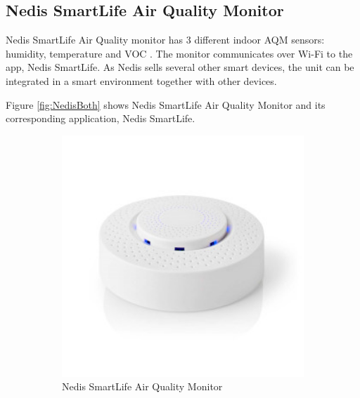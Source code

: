 \subsection{Nedis SmartLife Air Quality Monitor}
Nedis SmartLife Air Quality monitor has 3 different indoor \gls{AQM} sensors: humidity, temperature and VOC \cite{NedisDevice}. The monitor communicates over \gls{Wi-Fi} to the app, Nedis SmartLife. As Nedis sells several other smart devices, the unit can be integrated in a smart environment together with other devices. 

Figure \ref{fig:NedisBoth} shows Nedis SmartLife Air Quality Monitor and its corresponding application, Nedis SmartLife. 
\begin{figure} [H]
    \centering
    \begin{subfigure}{0.35\textwidth}
         \centering
         \includegraphics[width=1.2\textwidth]{figures/NedisDevice.jpg}
         \caption{Nedis SmartLife Air Quality Monitor \cite{Nedis}}
         \label{fig:NedisApp}
     \end{subfigure}
     \hspace{2cm}
      \begin{subfigure}{0.35\textwidth}
         \centering

\end{subfigure}
\end{figure}
